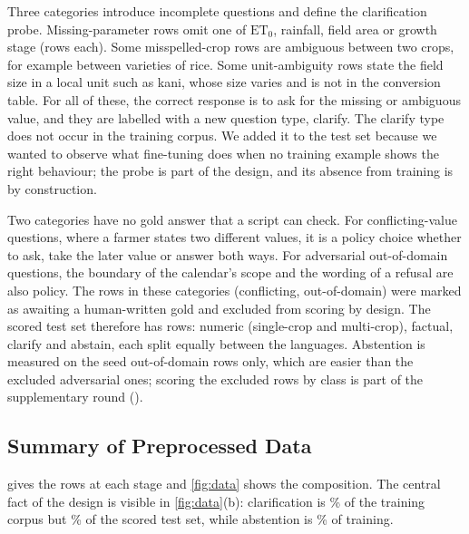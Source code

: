 Three categories introduce incomplete questions and define the clarification probe. Missing-parameter rows omit one of $\mathrm{ET}_0$, rainfall, field area or growth stage (\AdvMissingEt rows each). Some misspelled-crop rows are ambiguous between two crops, for example between varieties of rice. Some unit-ambiguity rows state the field size in a local unit such as kani, whose size varies and is not in the conversion table. For all of these, the correct response is to ask for the missing or ambiguous value, and they are labelled with a new question type, clarify. The clarify type does not occur in the training corpus. We added it to the test set because we wanted to observe what fine-tuning does when no training example shows the right behaviour; the probe is part of the design, and its absence from training is by construction.

Two categories have no gold answer that a script can check. For conflicting-value questions, where a farmer states two different values, it is a policy choice whether to ask, take the later value or answer both ways. For adversarial out-of-domain questions, the boundary of the calendar's scope and the wording of a refusal are also policy. The \TestExcluded rows in these categories (\TestExcludedConflict conflicting, \TestExcludedOOD out-of-domain) were marked as awaiting a human-written gold and excluded from scoring by design. The scored test set therefore has \TestScorable rows: \TestNumeric numeric (\NumericSingle single-crop and \NumericMulti multi-crop), \TestFactual factual, \TestClarify clarify and \TestAbstain abstain, each split equally between the languages. Abstention is measured on the \TestAbstain seed out-of-domain rows only, which are easier than the excluded adversarial ones; scoring the excluded rows by class is part of the supplementary round ().

\subsection{Summary of Preprocessed Data}
\label{sec:data-summary}

 gives the rows at each stage and \cref{fig:data} shows the composition. The central fact of the design is visible in \cref{fig:data}(b): clarification is \TrainPctClarify\% of the training corpus but \TestPctClarifyScorable\% of the scored test set, while abstention is \TrainPctAbstain\% of training.






